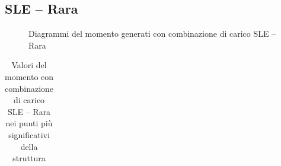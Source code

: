 \begin{landscape}
\subsection*{SLE -- Rara}
\begin{figure}[H]
\centering
{} 
\caption{Diagrammi del momento generati con combinazione di carico SLE -- Rara}
\label{fig:Momenti_SLScharacteristic}
\end{figure}
\begin{table}[H]
\centering
\caption{Valori del momento con combinazione di carico SLE -- Rara nei punti più significativi della struttura}
	\begin{tabular}{lS[table-format=3.2]S[table-format=3.2]S[table-format=3.2]S[table-format=3.2]S[table-format=3.2]S[table-format=3.2]S[table-format=3.2]S[table-format=3.2]S[table-format=3.2]S[table-format=3.2]S[table-format=3.2]S[table-format=3.2]S[table-format=3.2]}

\end{tabular}
\end{table}
\end{landscape}
